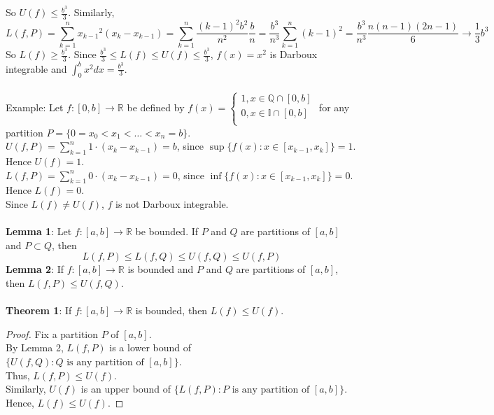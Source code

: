 \documentclass[12pt]{article}
\begin{document}
So $U(f)\leq\frac{b^3}3$. Similarly,
$$L(f,P)=\sum_{k=1}^n {x_{k-1}}^2(x_k-x_{k-1})=\sum_{k=1}^n\frac{(k-1)^2b^2}{n^2}\frac{b}n=\frac{b^3}{n^3}\sum_{k=1}^n(k-1)^2=\frac{b^3}{n^3}\frac{n(n-1)(2n-1)}6\rightarrow\frac13b^3$$
So $L(f)\geq\frac{b^3}3$. Since $\frac{b^3}3\leq L(f)\leq U(f)\leq\frac{b^3}3$, $f(x)=x^2$ is Darboux integrable and $\int_0^b x^2dx=\frac{b^3}3$.\\
\\
Example: Let $f:[0,b]\rightarrow\mathbb{R}$ be defined by $f(x)=\begin{cases}1,x\in\mathbb{Q}\cap[0,b]\\0,x\in\mathbb{I}\cap[0,b]\\ \end{cases}$ for any partition $P=\{0=x_0<x_1<\ldots<x_n=b\}$.\\
$U(f,P)=\sum_{k=1}^n 1\cdot(x_k-x_{k-1})=b$, since $\sup\{f(x):x\in[x_{k-1},x_k]\}=1$. Hence $U(f)=1$.\\
$L(f,P)=\sum_{k=1}^n 0\cdot(x_k-x_{k-1})=0$, since $\inf\{f(x):x\in[x_{k-1},x_k]\}=0$. Hence $L(f)=0$.\\
Since $L(f)\neq U(f)$, $f$ is not Darboux integrable.\\
\\
{\bf Lemma 1}: Let $f:[a,b]\rightarrow\mathbb{R}$ be bounded. If $P$ and $Q$ are partitions of $[a,b]$ and $P\subset Q$, then
\begin{equation}
L(f,P)\leq L(f,Q)\leq U(f,Q)\leq U(f,P)
\end{equation}
{\bf Lemma 2}: If $f:[a,b]\rightarrow\mathbb{R}$ is bounded and $P$ and $Q$ are partitions of $[a,b]$, then $L(f,P)\leq U(f,Q)$.\\
\\
{\bf Theorem 1}: If $f:[a,b]\rightarrow\mathbb{R}$ is bounded, then $L(f)\leq U(f)$.
\begin{proof}
Fix a partition $P$ of $[a,b]$.\\
By Lemma 2, $L(f,P)$ is a lower bound of $\{U(f,Q):Q\text{ is any partition of }[a,b]\}$.\\
Thus, $L(f,P)\leq U(f)$.\\
Similarly, $U(f)$ is an upper bound of $\{L(f,P):P\text{ is any partition of }[a,b]\}$.\\
Hence, $L(f)\leq U(f)$.
\end{proof}

${}$\\
\end{document}
